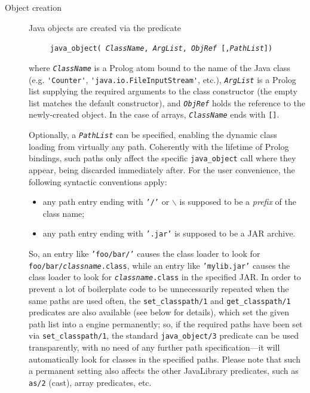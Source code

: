\begin{description}
  \item [Object creation]
        Java objects are created via the predicate

        \texttt{~~~~~java\_object(%
                 \textit{ClassName}, \textit{ArgList}, \textit{ObjRef} [,\textit{PathList}])}

        where \texttt{\textit{ClassName}} is a Prolog atom bound to the name of the
        Java class (e.g. \verb|'Counter'|, \verb|'java.io.FileInputStream'|, etc.), \texttt{\textit{ArgList}} is a Prolog list supplying the required arguments to the class constructor (the empty list matches the default constructor), and \texttt{\textit{ObjRef}} holds the reference to the newly-created object.
        In the case of arrays, \texttt{\textit{ClassName}} ends with \texttt{[]}.

        Optionally, a \texttt{\textit{PathList}} can be specified, enabling the dynamic class loading from virtually any path.
        Coherently with the lifetime of Prolog bindings, such paths only affect the specific \texttt{java\_object} call where
        they appear, being discarded immediately after. For the user convenience, the following syntactic conventions apply:
        \begin{itemize}
          \item any path entry ending with \texttt{'/'} or \texttt{$\backslash$} is supposed to be a \textit{prefix} of the class name;
          \item any path entry ending with \texttt{'.jar'} is supposed to be a JAR archive.
        \end{itemize}
        \noindent So, an entry like \texttt{'foo/bar/'} causes the \tuprolog{} class loader to look for \texttt{foo/bar/\textit{classname}.class}, while an entry like \texttt{'mylib.jar'} causes the
        \tuprolog{} class loader to look for \texttt{\textit{classname}.class} in the specified JAR.
        In order to prevent a lot of boilerplate code to be unnecessarily repeated when the same paths are used often, the \texttt{set\_classpath/1} and \texttt{get\_classpath/1} predicates are also available (see below for details), which
        set the given path list into a \tuprolog{} engine permanently; so, if the required paths have been set via
        \texttt{set\_classpath/1}, the standard \texttt{java\_object/3} predicate can be used transparently, with no need
        of any further path specification---it will automatically look for classes in the specified paths.
        Please note that such a permanent setting also affects the other JavaLibrary predicates, such as \texttt{as/2} (cast),
        array predicates, etc.


\end{description}
